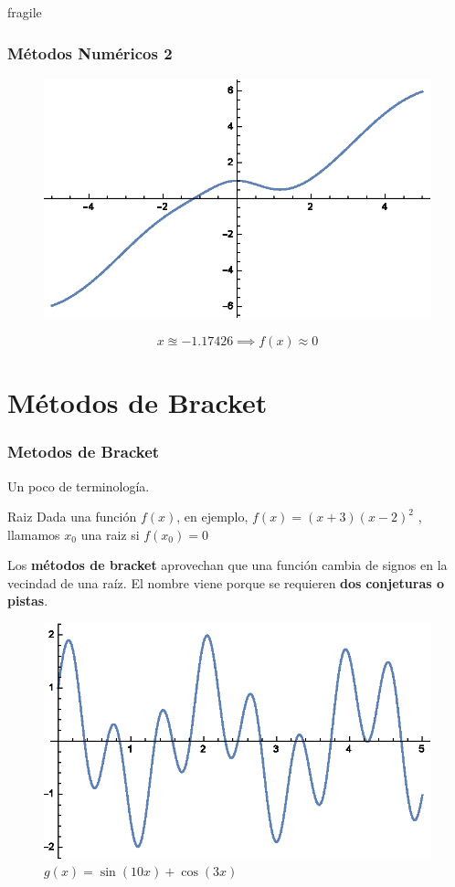 \documentclass{beamer}
\begin{document}
\begin{frame}{fragile}
	\frametitle{Métodos Numéricos 2}
	\begin{figure}
		\includegraphics{Graph1}
	\end{figure}
	\[ x \approxeq -1.17426 \implies f(x) \approx 0  \]
\end{frame}


\section{Métodos de Bracket}

\begin{frame}
	\frametitle{Metodos de Bracket}
	Un poco de terminología.
	\begin{block}{Raiz}
		Dada una función $ f(x) $, en ejemplo, $ f(x) = (x+3)(x-2)^2 $ , llamamos $ x_0 $ una raiz si $ f(x_0) = 0 $
	\end{block}
	Los \textbf{métodos de bracket} aprovechan que una función cambia de signos en la vecindad de una raíz. El nombre viene porque se requieren \textbf{dos} \textbf{conjeturas o pistas}.
\end{frame}


\begin{frame}[fragile]
	\begin{figure}
		\includegraphics{Graph2}
		\caption{$ g(x) = \sin(10x) + \cos(3x) $}
	\end{figure}
\end{frame}
\end{document}
